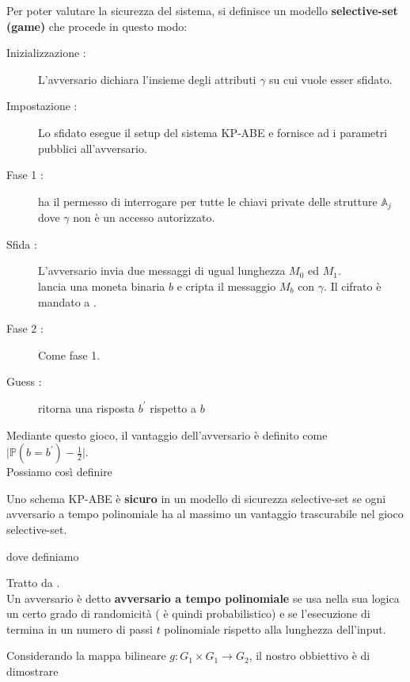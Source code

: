 Per poter valutare la sicurezza del sistema, si definisce un modello \textbf{selective-set (game)} che procede in questo modo:
\begin{description}
\item[Inizializzazione :] L'avversario  dichiara l'insieme degli attributi $\gamma$ su cui vuole esser sfidato.
\item[Impostazione :] Lo sfidato  esegue il setup del sistema KP-ABE e fornisce ad  i parametri pubblici all'avversario.
\item[Fase 1 :]  ha il permesso di interrogare  per tutte le chiavi private delle strutture $\mathbb{A}_j$ dove $\gamma$ non è un accesso autorizzato.
\item[Sfida :] L'avversario  invia due messaggi di ugual lunghezza $M_0$ ed $M_1$.\\
 lancia una moneta binaria $b$ e cripta il messaggio $M_b$ con $\gamma$. Il cifrato è mandato a .
\item[Fase 2 :] Come fase 1.
\item[Guess :]  ritorna una risposta $b^\prime$ rispetto a $b$
\end{description}

Mediante questo gioco, il vantaggio dell'avversario  è definito come $\lvert \mathbb{P}(b = b^\prime) - \frac{1}{2}\rvert$.\\
Possiamo così definire 

\begin{defi}
Uno schema KP-ABE è \textbf{sicuro} in un modello di sicurezza selective-set se ogni avversario a tempo polinomiale ha al massimo un vantaggio trascurabile nel gioco selective-set.
\end{defi}

dove definiamo
\begin{defi}
Tratto da \cite[Def~1.2]{crittoalice}.\\
Un avversario  è detto \textbf{avversario a tempo polinomiale} se usa nella sua logica un certo grado di randomicità ( è quindi probabilistico) e se l'esecuzione di  termina in un numero di passi $t$ polinomiale rispetto alla lunghezza dell'input. 
\end{defi}


Considerando la mappa bilineare $g:G_1 \times G_1 \rightarrow G_2$, il nostro obbiettivo è di dimostrare

